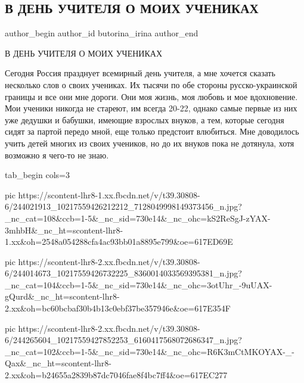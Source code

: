  
 
 
 
 
 
\subsection{В ДЕНЬ УЧИТЕЛЯ О МОИХ УЧЕНИКАХ}
\label{sec:05_10_2021.fb.butorina_irina.1.v_den_uchitelja_ob_uchenikah}
 
\ifcmt
 author_begin
   author_id butorina_irina
 author_end
\fi

В ДЕНЬ УЧИТЕЛЯ О МОИХ УЧЕНИКАХ

Сегодня Россия празднует всемирный день учителя, а мне  хочется сказать
несколько слов о своих учениках. Их тысячи по обе стороны русско-украинской
границы и все они мне дороги. Они моя жизнь, моя любовь и мое вдохновение. Мои
ученики никогда не стареют, им всегда 20-22, однако самые первые из них уже
дедушки и бабушки, имеющие взрослых внуков, а тем, которые сегодня сидят за
партой передо мной, еще только предстоит влюбиться. Мне доводилось учить детей
многих из своих учеников, но до их внуков пока не дотянула, хотя возможно я
чего-то не знаю. 

\ifcmt
  tab_begin cols=3

     pic https://scontent-lhr8-1.xx.fbcdn.net/v/t39.30808-6/244021913_10217559426212212_7128049998149373456_n.jpg?_nc_cat=108&ccb=1-5&_nc_sid=730e14&_nc_ohc=kS2ReSgJ-zYAX-3mhbH&_nc_ht=scontent-lhr8-1.xx&oh=2548a054288cfa4ac93bb01a8895e799&oe=617ED69E

     pic https://scontent-lhr8-2.xx.fbcdn.net/v/t39.30808-6/244014673_10217559426732225_8360014033569395381_n.jpg?_nc_cat=104&ccb=1-5&_nc_sid=730e14&_nc_ohc=3otUhr_-9uUAX-gQurd&_nc_ht=scontent-lhr8-2.xx&oh=bc60bcbaf30b4b13c0ebf37be357946e&oe=617E354F

     pic https://scontent-lhr8-2.xx.fbcdn.net/v/t39.30808-6/244265604_10217559427852253_6160417568072686347_n.jpg?_nc_cat=102&ccb=1-5&_nc_sid=730e14&_nc_ohc=R6K3mCtMKOYAX-_-Qax&_nc_ht=scontent-lhr8-2.xx&oh=b24655a2839b87dc7046fae8f4bc7ff4&oe=617EC277

